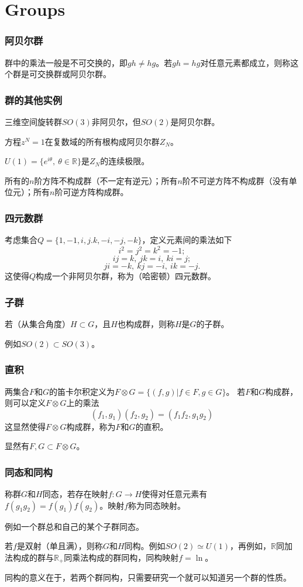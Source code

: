 \documentclass[CJK]{beamer}
\newcommand{\reals}{\mathbb{R}}
\begin{document}
\section{Groups}
\begin{frame}
\frametitle{\bch 阿贝尔群 \ech}
\bch
群中的乘法一般是不可交换的，即$gh \not= hg$。若$gh = hg$对任意元素都成立，则称这个群是可交换群或阿贝尔群。

\ech
\end{frame}

\begin{frame}
\frametitle{\bch 群的其他实例 \ech}
\bch
三维空间旋转群$SO(3)$非阿贝尔，但$SO(2)$是阿贝尔群。
\par
方程$z^N = 1$在复数域的所有根构成阿贝尔群$Z_N$。
\par
$U(1) = \{ e^{i \theta},\ \theta \in \reals\}$是$Z_N$的连续极限。
\par
所有的$n$阶方阵不构成群（不一定有逆元）；所有$n$阶不可逆方阵不构成群（没有单位元）；所有$n$阶可逆方阵构成群。

\ech
\end{frame}

\begin{frame}
\frametitle{\bch 四元数群 \ech}
\bch
考虑集合$Q = \{ 1,-1,i,j.k,-i,-j,-k\}$，定义元素间的乘法如下
$$ i^2 = j^2 = k^2 = -1;$$
$$ ij = k,\ jk = i,\ ki = j;$$
$$ji = -k,\ kj = -i,\ ik = -j.$$
这使得$Q$构成一个非阿贝尔群，称为（哈密顿）四元数群。

\ech
\end{frame}


\begin{frame}
\frametitle{\bch 子群 \ech}
\bch
若（从集合角度）$H\subset G$，且$H$也构成群，则称$H$是$G$的子群。\par
例如$SO(2) \subset SO(3)$。


\ech
\end{frame}

\begin{frame}
\frametitle{\bch 直积 \ech}
\bch
两集合$F$和$G$的笛卡尔积定义为$F\otimes G = \{ (f,g) | f\in F, g \in G\}$。
若$F$和$G$构成群，则可以定义$F\otimes G$上的乘法
$$ (f_1,g_1) (f_2,g_2) = (f_1 f_2,g_1g_2)$$
这显然使得$F\otimes G$构成群，称为$F$和$G$的直积。
\par
显然有$F,G \subset F \otimes G$。


\ech
\end{frame}

\begin{frame}
\frametitle{\bch 同态和同构 \ech}
\bch
称群$G$和$H$同态，若存在映射$f: G \to H$使得对任意元素有$f(g_1 g_2) = f(g_1) f(g_2)$。映射$f$称为同态映射。
\par
例如一个群总和自己的某个子群同态。
\par
若$f$是双射（单且满），则称$G$和$H$同构。例如$SO(2) \simeq U(1)$，再例如，$\reals$同加法构成的群与$\reals_+$同乘法构成的群同构，同构映射$f = \ln$。
\par
同构的意义在于，若两个群同构，只需要研究一个就可以知道另一个群的性质。


\ech
\end{frame}
\end{document}
